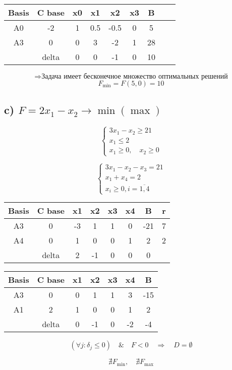 \documentclass[17pt]{extarticle}
\begin{document}
\begin{table}[H]
    \centering
    \begin{tabular}{c|c|cccccc|c}
        \toprule
        Basis & C base & x0 & x1  & x2   & x3 & B  \\
        \midrule
        A0    & -2     & 1  & 0.5 & -0.5 & 0  & 5  \\
        A3    & 0      & 0  & 3   & -2   & 1  & 28 \\
        \midrule
              & delta  & 0  & 0   & -1   & 0  & 10 \\
    \end{tabular}
\end{table}

\[
    \Rightarrow \text{Задача имеет бесконечное множество оптимальных решений}
\]
\[
    F_{\text{min}} = F(5, 0) = 10
\]

\subsection*{c) \( F = 2x_1 - x_2 \to \min (\max) \)}

\[
    \begin{cases}
        3x_1 - x_2 \geq 21 \\
        x_1 \leq 2         \\
        x_1 \geq 0, \quad x_2 \geq 0
    \end{cases}
\]

\[
    \begin{cases}
        3x_1 - x_2 - x_3 = 21 \\
        x_1 + x_4 = 2         \\
        x_i \geq 0, i=\overline{1, 4}
    \end{cases}
\]

\begin{table}[H]
    \centering
    \begin{tabular}{c|c|cccc|cc}
        \toprule
        Basis & C base & x1 & x2 & x3 & x4 & B   & r \\
        \midrule
        A3    & 0      & -3 & 1  & 1  & 0  & -21 & 7 \\
        A4    & 0      & 1  & 0  & 0  & 1  & 2   & 2 \\
        \midrule
              & delta  & 2  & -1 & 0  & 0  & 0   &   \\
        \bottomrule
    \end{tabular}
\end{table}

\begin{table}[H]
    \centering
    \begin{tabular}{c|c|cccc|c}
        \toprule
        Basis & C base & x1 & x2 & x3 & x4 & B   \\
        \midrule
        A3    & 0      & 0  & 1  & 1  & 3  & -15 \\
        A1    & 2      & 1  & 0  & 0  & 1  & 2   \\
        \midrule
              & delta  & 0  & -1 & 0  & -2 & -4  \\
        \bottomrule
    \end{tabular}
\end{table}

\[
    (\forall j : \delta_j \leq 0) \quad \& \quad F < 0 \quad \Rightarrow \quad D = \emptyset
\]

\[
    \nexists F_{\text{min}}, \quad \nexists F_{\text{max}}
\]
\end{document}
